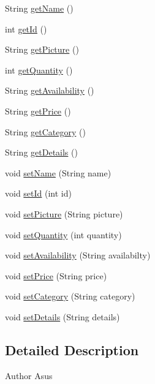 \begin{DoxyCompactItemize}
\item 
String \mbox{\hyperlink{class_product_a7cd7a5ab2efcd0a3214e1e7928006e1a}{get\+Name}} ()
\item 
int \mbox{\hyperlink{class_product_a7defaa7ccf44eaade9c514f73a8c16b0}{get\+Id}} ()
\item 
String \mbox{\hyperlink{class_product_a5fdebffb244aadcbc3de652976af1b7d}{get\+Picture}} ()
\item 
int \mbox{\hyperlink{class_product_a46e0266bf10d4fe4972eea290d59b783}{get\+Quantity}} ()
\item 
String \mbox{\hyperlink{class_product_a26824d57b611d392819d5fe74cc44ed7}{get\+Availability}} ()
\item 
String \mbox{\hyperlink{class_product_acd98d30d99facb52c93b64783e90c7a8}{get\+Price}} ()
\item 
String \mbox{\hyperlink{class_product_a3fe94b7c87c730e063377298cd06d2f3}{get\+Category}} ()
\item 
String \mbox{\hyperlink{class_product_a7e52ee55a2040ed43de668ba06305899}{get\+Details}} ()
\item 
void \mbox{\hyperlink{class_product_a47566319fb32692c6c0cf2326d6a8e8d}{set\+Name}} (String name)
\item 
void \mbox{\hyperlink{class_product_a611c68129427dea75fa1f811b0dc19bc}{set\+Id}} (int id)
\item 
void \mbox{\hyperlink{class_product_ad04da42d2b2912956e849a8246ee3403}{set\+Picture}} (String picture)
\item 
void \mbox{\hyperlink{class_product_a8a0578b77798b2ff33b585cc599f3172}{set\+Quantity}} (int quantity)
\item 
void \mbox{\hyperlink{class_product_aff893d8ef6f6f70bc70c5a99bb1049a3}{set\+Availability}} (String availabilty)
\item 
void \mbox{\hyperlink{class_product_a58a8d85fcc80621b05492093b025e173}{set\+Price}} (String price)
\item 
void \mbox{\hyperlink{class_product_a2403ef234d4f53d97d2e4535aa076e8d}{set\+Category}} (String category)
\item 
void \mbox{\hyperlink{class_product_acf9f458bbdef71e32236d6ee94748f89}{set\+Details}} (String details)
\end{DoxyCompactItemize}


\subsection{Detailed Description}
\begin{DoxyAuthor}{Author}
Asus 
\end{DoxyAuthor}


